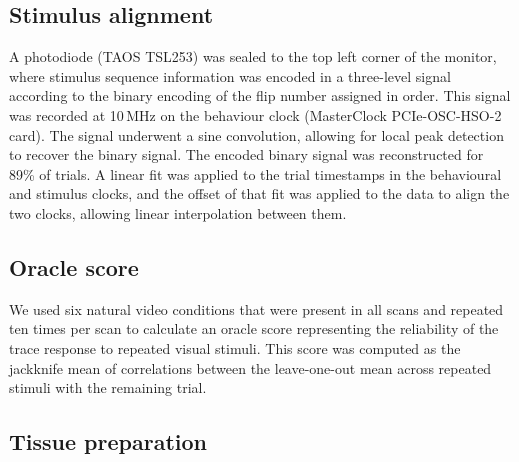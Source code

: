 \documentclass{article}
\begin{document}
\subsection*{Stimulus alignment}

A photodiode (TAOS TSL253) was sealed to the top left corner of the monitor, where stimulus sequence information was encoded in a three-level signal according to the binary encoding of the flip number assigned in order. This signal was recorded at 10\,MHz on the behaviour clock (MasterClock PCIe-OSC-HSO-2 card). The signal underwent a sine convolution, allowing for local peak detection to recover the binary signal. The encoded binary signal was reconstructed for 89\% of trials. A linear fit was applied to the trial timestamps in the behavioural and stimulus clocks, and the offset of that fit was applied to the data to align the two clocks, allowing linear interpolation between them.

\subsection*{Oracle score}

We used six natural video conditions that were present in all scans and repeated ten times per scan to calculate an oracle score representing the reliability of the trace response to repeated visual stimuli. This score was computed as the jackknife mean of correlations between the leave-one-out mean across repeated stimuli with the remaining trial.

\subsection*{Tissue preparation}
\end{document}
